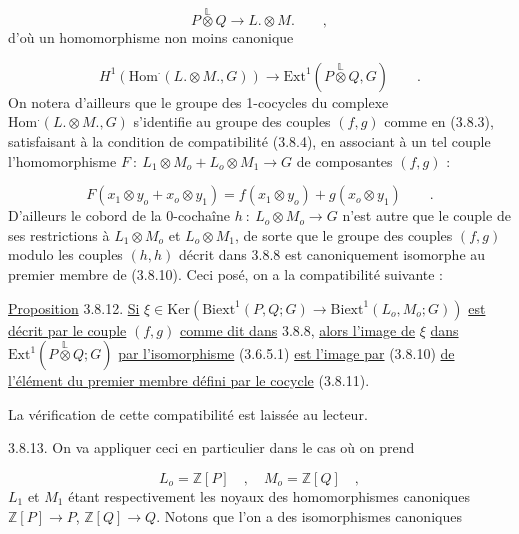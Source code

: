 \begin{equation*}
P \overset{\mathbb{L}}{\otimes} Q \longrightarrow L. \otimes M. \qquad ,
\end{equation*}
d'où un homomorphisme non moins canonique

\begin{equation}\tag{3.8.10}
H^1(\mathrm{Hom}^{.}(L. \otimes M.,G)) \longrightarrow \mathrm{Ext}^1(P \overset{\mathbb{L}}{\otimes} Q,G) \qquad .
\end{equation}
On notera d'ailleurs que le groupe des 1-cocycles du complexe $\mathrm{Hom}^{.}(L. \otimes M.,G)$ s'identifie au groupe des couples $(f,g)$ comme en (3.8.3), satisfaisant à la condition de compatibilité (3.8.4), en associant à un tel couple l'homomorphisme $F \ : \ L_1 \otimes M_o + L_o \otimes M_1 \longrightarrow G$ de composantes $(f,g)$ :

\begin{equation}\tag{3.8.11}
F(x_1 \otimes y_o + x_o \otimes y_1) = f(x_1 \otimes y_o) + g(x_o \otimes y_1) \qquad .
\end{equation}
D'ailleurs le cobord de la 0-cochaîne $h \ : \ L_o \otimes M_o \longrightarrow G$ n'est autre que le couple de ses restrictions à $L_1 \otimes M_o$ et $L_o \otimes M_1$, de sorte que le groupe des
couples $(f,g)$ modulo les couples $(h,h)$ décrit dans 3.8.8 est canoniquement isomorphe au premier membre de (3.8.10). Ceci posé, on a la compatibilité suivante :

\underline{Proposition} 3.8.12. \underline{Si} $\xi \in \mathrm{Ker}(\mathrm{Biext}^1(P,Q;G) \longrightarrow \mathrm{Biext}^1(L_o,M_o;G))$ \underline{est} \underline{décrit par le couple} $(f,g)$ \underline{comme dit dans} 3.8.8, \underline{alors l'image de} $\xi$ \underline{dans} $\mathrm{Ext}^1(P \overset{\mathbb{L}}{\otimes} Q;G)$ \underline{par l'isomorphisme} (3.6.5.1) \underline{est l'image par} (3.8.10) \underline{de} \underline{l'élément du premier membre défini par le cocycle} (3.8.11).

La vérification de cette compatibilité est laissée au lecteur.

3.8.13. On va appliquer ceci en particulier dans le cas où on prend

\begin{equation*}
L_o = \mathbb{Z}[P] \quad , \quad M_o = \mathbb{Z}[Q] \quad ,
\end{equation*}
$L_1$ et $M_1$ étant respectivement les noyaux des homomorphismes canoniques $\mathbb{Z}[P] \longrightarrow P$, $\mathbb{Z}[Q] \longrightarrow Q$. Notons que l'on a des isomorphismes canoniques

